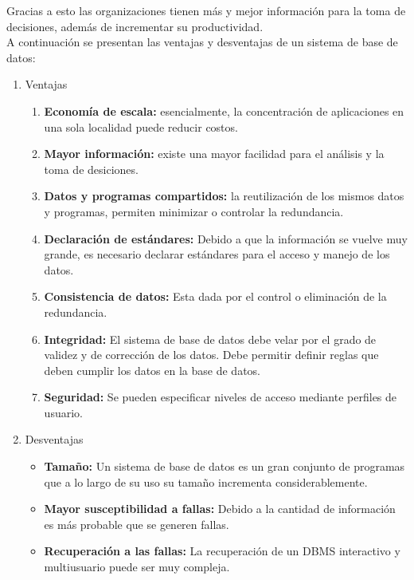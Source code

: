 	Gracias a esto las organizaciones tienen m\'as y mejor informaci\'on para la toma de decisiones, adem\'as de incrementar su productividad.\\

	A continuaci\'on se presentan las ventajas y desventajas de un sistema de base de datos:
	\begin{enumerate}
		\item Ventajas
			\begin{enumerate}
				\item \textbf{Econom\'ia de escala:} esencialmente, la concentraci\'on de aplicaciones en una sola localidad puede reducir costos.
				\item \textbf{Mayor informaci\'on:} existe una mayor facilidad para el an\'alisis y la toma de desiciones.
				\item \textbf{Datos y programas compartidos:} la reutilizaci\'on de los mismos datos y programas, permiten minimizar o controlar la redundancia.
				\item \textbf{Declaraci\'on de est\'andares:} Debido a que la informaci\'on se vuelve muy grande, es necesario declarar est\'andares para el acceso y manejo de los datos.
				\item \textbf{Consistencia de datos:} Esta dada por el control o eliminaci\'on de la redundancia.
				\item \textbf{Integridad:} El sistema de base de datos debe velar por el grado de validez y de correcci\'on de los datos. Debe permitir definir reglas que deben cumplir los datos en la base de datos.
				\item \textbf{Seguridad:} Se pueden especificar niveles de acceso mediante perfiles de usuario.
			\end{enumerate}
		\item Desventajas
			\begin{itemize}
				\item \textbf{Tama\~no:} Un sistema de base de datos es un gran conjunto de programas que a lo largo de su uso su tama\~no incrementa considerablemente.
				\item \textbf{Mayor susceptibilidad a fallas:} Debido a la cantidad de informaci\'on es m\'as probable que se generen fallas.
				\item \textbf{Recuperaci\'on a las fallas:} La recuperaci\'on de un DBMS interactivo y multiusuario puede ser muy compleja.
			\end{itemize}
	\end{enumerate}

